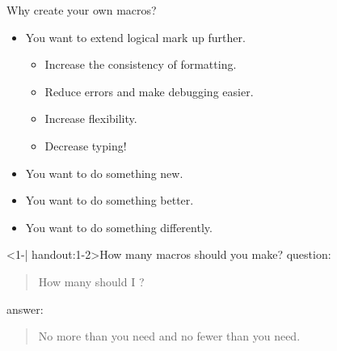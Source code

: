 \begin{frame}{Why create your own macros?}
  \begin{itemize}
  	\item You want to extend logical mark up further.
	\begin{itemize}
	  \item Increase the consistency of formatting.
	  \item Reduce errors and make debugging easier.
	  \item Increase flexibility.
	  \item Decrease typing!
	\end{itemize}
	\item You want to do something new.
	\item You want to do something better.
	\item You want to do something differently.
  \end{itemize}
\end{frame}

\begin{frame}<1-| handout:1-2>{How many macros should you make?}
   question:
    \begin{quotation}
      How many  should I ?
    \end{quotation}

     answer:
    \begin{quotation}
        No more than you need and no fewer than you need.
    \end{quotation}
\end{frame}

